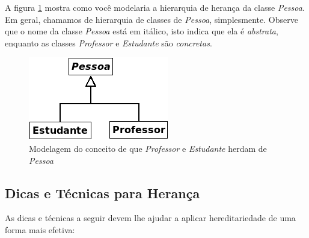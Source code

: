 A figura \ref{fig:uml2} mostra como você modelaria a hierarquia de herança da classe \emph{Pessoa}. Em geral, chamamos de hierarquia de classes de \emph{Pessoa}, simplesmente. Observe que o nome da classe \emph{Pessoa} está em itálico, isto indica que ela é \textit{abstrata}, enquanto as classes \emph{Professor} e \emph{Estudante} são \textit{concretas}.

\begin{figure}[h]
\begin{center}
\includegraphics[scale=0.8]{uml2.png} 
\caption{Modelagem do conceito de que \emph{Professor} e \emph{Estudante} herdam de \emph{Pessoa}} \label{fig:uml2}
\end{center}
\end{figure}

\subsection{Dicas e Técnicas para Herança}

As dicas e técnicas a seguir devem lhe ajudar a aplicar hereditariedade de uma forma mais efetiva:

